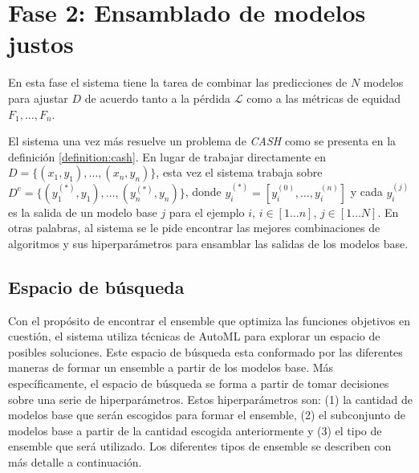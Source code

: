\section{Fase 2: Ensamblado de modelos justos}\label{section:second-phase}

En esta fase el sistema tiene la tarea de combinar las predicciones de $N$ modelos para ajustar $D$ de acuerdo tanto a la pérdida $\mathcal{L}$ como a las métricas de equidad $F_1, \dots, F_n$.

El sistema una vez más resuelve un problema de \emph{CASH} como se presenta en la definición \ref{definition:cash}.
En lugar de trabajar directamente en $D = \{(x_1,y_1),\dots, (x_n,y_n)\}$, esta vez el sistema trabaja sobre $D^e = \{(y_1^{(*)}, y_1),\dots,(y_n^{(*)}, y_n)\}$, donde $y_i^{(*)} = [y_i^{(0)},\dots,y_i^{(n)}]$ y cada $y_i^{(j)}$ es la salida de un modelo base $j$ para el ejemplo $i$, $i\in[1 \dots n]$, $j\in[1 \dots N]$.
En otras palabras, al sistema se le pide encontrar las mejores combinaciones de algoritmos y sus hiperparámetros para ensamblar las salidas de los modelos base.

\subsection{Espacio de búsqueda}

Con el propósito de encontrar el ensemble que optimiza las funciones objetivos en cuestión, el sistema utiliza técnicas de AutoML para explorar un espacio de posibles soluciones.
Este espacio de búsqueda esta conformado por las diferentes maneras de formar un ensemble a partir de los modelos base.
Más específicamente, el espacio de búsqueda se forma a partir de tomar decisiones sobre una serie de hiperparámetros.
Estos hiperparámetros son: (1) la cantidad de modelos base que serán escogidos para formar el ensemble, (2) el subconjunto de modelos base a partir de la cantidad escogida anteriormente y (3) el tipo de ensemble que será utilizado.
Los diferentes tipos de ensemble se describen con más detalle a continuación.

